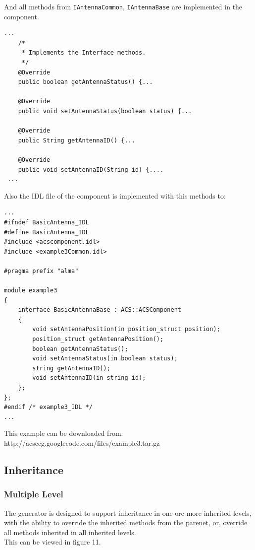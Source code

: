 And all methods from \verb+IAntennaCommon+, \verb+IAntennaBase+  are implemented
in the component.
\begin{center}
\begin{verbatim}
...
    /*
     * Implements the Interface methods.
     */
    @Override
    public boolean getAntennaStatus() {...

    @Override
    public void setAntennaStatus(boolean status) {...

    @Override
    public String getAntennaID() {...

    @Override
    public void setAntennaID(String id) {....
 ...
\end{verbatim}
\end{center}

Also the IDL file of the component is implemented with this methods to:
\begin{center}
\begin{verbatim}
...
#ifndef BasicAntenna_IDL
#define BasicAntenna_IDL
#include <acscomponent.idl>
#include <example3Common.idl>

#pragma prefix "alma"

module example3
{
    interface BasicAntennaBase : ACS::ACSComponent
    {
        void setAntennaPosition(in position_struct position);
        position_struct getAntennaPosition();
        boolean getAntennaStatus();
        void setAntennaStatus(in boolean status);
        string getAntennaID();
        void setAntennaID(in string id);
    };
};
#endif /* example3_IDL */
...
\end{verbatim}
\end{center}

This example can be downloaded from:
http://acsccg.googlecode.com/files/example3.tar.gz

\subsection{Inheritance}

\subsubsection{Multiple Level}
The generator is designed to support inheritance in one ore more inherited
levels, with the ability to override the inherited methods from the parenet, or,
override all methods inherited in all inherited levels.\\
This can be viewed in figure 11.


